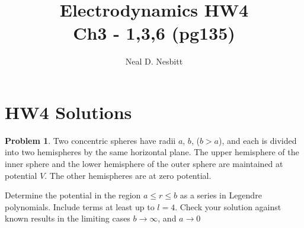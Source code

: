 \documentclass{article}
\title{Electrodynamics HW4\\
Ch3 - 1,3,6 (pg135)}
\author{Neal D. Nesbitt}
\begin{document}
\maketitle

\theoremstyle{definition}
\newtheorem{problem}{Problem}
\newtheorem{solution}{Solution}

\setcounter{section}{3}
\section{HW4 Solutions}

\begin{problem}\label{problem3.1}
Two concentric spheres have radii $a$, $b$, ($b>a$), and each is divided into two hemispheres by the same horizontal plane. The upper hemisphere of the inner sphere and the lower hemisphere of the outer sphere are maintained at potential $V$. The other hemispheres are at zero potential.

Determine the potential in the region $a \le r \le b$ as a series in Legendre polynomials. Include terms at least up to $l=4$. Check your solution against known results in the limiting cases $b \to \infty$, and $a \to 0$
\end{problem}
\end{document}

